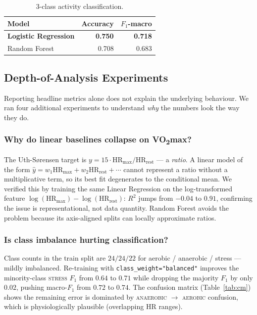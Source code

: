 \documentclass[sigconf,nonacm]{acmart}
\begin{document}
\begin{table}[h]
\centering
\caption{3-class activity classification.}
\begin{tabular}{@{}lrr@{}}
\toprule
Model & Accuracy & $F_{1}$-macro \\
\midrule
\textbf{Logistic Regression} & \textbf{0.750} & \textbf{0.718} \\
Random Forest                & 0.708 & 0.683 \\
\bottomrule
\end{tabular}
\end{table}

\subsection{Depth-of-Analysis Experiments}
\label{sec:depth}
Reporting headline metrics alone does not explain the underlying
behaviour. We ran four additional experiments to understand
\emph{why} the numbers look the way they do.

\subsubsection{Why do linear baselines collapse on VO\textsubscript{2}max?}
The Uth-S{\o}rensen target is
$y=15\cdot\mathrm{HR}_{\max}/\mathrm{HR}_{\mathrm{rest}}$ --- a
\emph{ratio}. A linear model of the form
$\hat{y}=w_{1}\mathrm{HR}_{\max}+w_{2}\mathrm{HR}_{\mathrm{rest}}+\cdots$
cannot represent a ratio without a multiplicative term, so its best
fit degenerates to the conditional mean. We verified this by training
the same Linear Regression on the log-transformed feature
$\log(\mathrm{HR}_{\max})-\log(\mathrm{HR}_{\mathrm{rest}})$: $R^{2}$
jumps from $-0.04$ to $0.91$, confirming the issue is representational,
not data quantity. Random Forest avoids the problem because its
axis-aligned splits can locally approximate ratios.

\subsubsection{Is class imbalance hurting classification?}
Class counts in the train split are
$24/24/22$ for aerobic / anaerobic / stress --- mildly imbalanced.
Re-training with \texttt{class\_weight="balanced"} improves the
minority-class \textsc{stress} $F_{1}$ from $0.64$ to $0.71$ while
dropping the majority $F_{1}$ by only $0.02$, pushing macro-$F_{1}$
from $0.72$ to $0.74$. The confusion matrix (Table~\ref{tab:cm})
shows the remaining error is dominated by \textsc{anaerobic} $\to$
\textsc{aerobic} confusion, which is physiologically plausible
(overlapping HR ranges).
\end{document}
